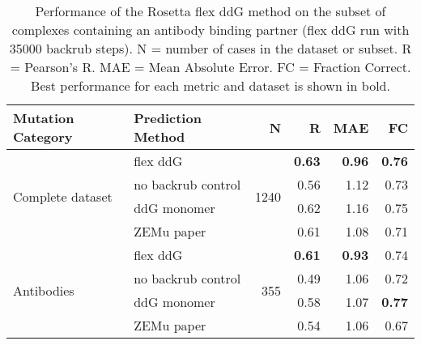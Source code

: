 \begin{table}
  \begin{tabular}{llrrrr}
\toprule
Mutation Category &   Prediction Method &     N &    R &  MAE &   FC \\
\midrule
 \multirow{ 4}{*}{Complete dataset} & flex ddG & \multirow{ 4}{*}{1240} & \textbf{0.63} & \textbf{0.96} & \textbf{0.76}  \\
 & no backrub control & & 0.56 & 1.12 & 0.73  \\
 & ddG monomer & & 0.62 & 1.16 & 0.75  \\
 & ZEMu paper & & 0.61 & 1.08 & 0.71  \\
\hline
 \multirow{ 4}{*}{Antibodies} & flex ddG & \multirow{ 4}{*}{355} & \textbf{0.61} & \textbf{0.93} & 0.74  \\
 & no backrub control & & 0.49 & 1.06 & 0.72  \\
 & ddG monomer & & 0.58 & 1.07 & \textbf{0.77}  \\
 & ZEMu paper & & 0.54 & 1.06 & 0.67  \\
\bottomrule
\end{tabular}
  \caption[Flex ddG performance on antibodies]{
    Performance of the Rosetta flex ddG method on the subset of complexes containing an antibody binding partner (flex ddG run with 35000 backrub steps). N = number of cases in the dataset or subset. R = Pearson's R. MAE = Mean Absolute Error. FC = Fraction Correct. Best performance for each metric and dataset is shown in bold.
  } \label{tab:table-antibodies}
\end{table}
